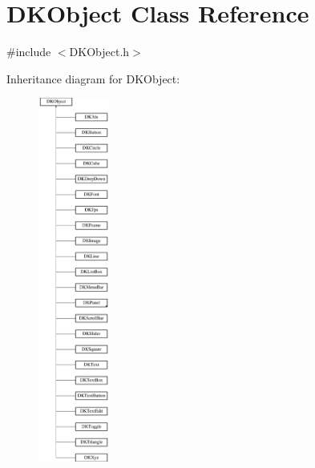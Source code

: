 \hypertarget{class_d_k_object}{\section{D\-K\-Object Class Reference}
\label{class_d_k_object}
}


{\ttfamily \#include $<$D\-K\-Object.\-h$>$}

Inheritance diagram for D\-K\-Object\-:\begin{figure}[H]
\begin{center}
\leavevmode
\includegraphics[height=12.000000cm]{class_d_k_object}
\end{center}
\end{figure}
